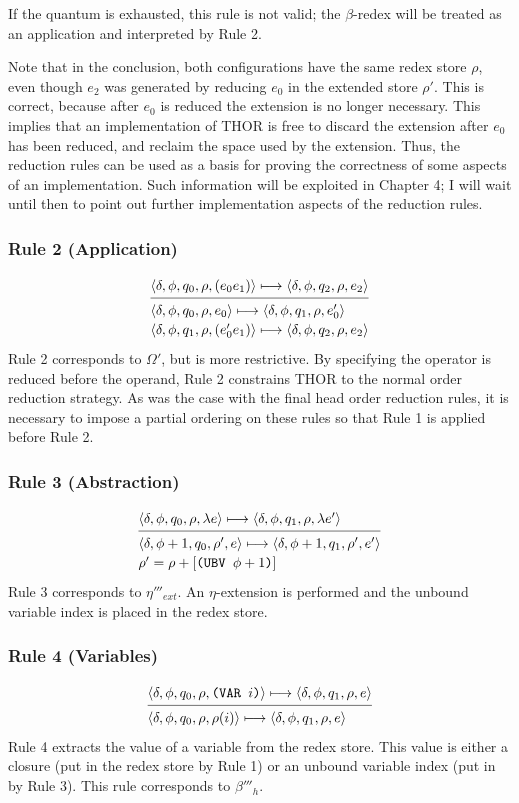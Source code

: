 If the quantum is exhausted, this rule is not valid; the \(\beta\)-redex will be
treated as an application and interpreted by Rule 2.

Note that in the conclusion, both configurations have the same redex store
\(\rho\), even though \(e_2\) was generated by reducing \(e_0\) in the extended
store \(\rho'\). This is correct, because after \(e_0\) is reduced the extension
is no longer necessary. This implies that an implementation of THOR is free to
discard the extension after \(e_0\) has been reduced, and reclaim the space used
by the extension. Thus, the reduction rules can be used as a basis for proving
the correctness of some aspects of an implementation. Such information will be
exploited in Chapter 4; I will wait until then to point out further
implementation aspects of the reduction rules.

\subsubsection*{Rule 2 (Application)}
\[
\semanticrule{
\cfg{\delta}{\phi}{q_0}{\rho}{(e_0e_1)}\redsto
\cfg{\delta}{\phi}{q_2}{\rho}{e_2}
}{
\cfg{\delta}{\phi}{q_0}{\rho}{e_0}\redsto
\cfg{\delta}{\phi}{q_1}{\rho}{e'_0}
\\
\cfg{\delta}{\phi}{q_1}{\rho}{(e'_0e_1)}\redsto
\cfg{\delta}{\phi}{q_2}{\rho}{e_2}
}
\]
Rule 2 corresponds to \(\Omega'\), but is more restrictive. By specifying the
operator is reduced before the operand, Rule 2 constrains THOR to the normal
order reduction strategy. As was the case with the final head order reduction
rules, it is necessary to impose a partial ordering on these rules so that Rule
1 is applied before Rule 2.

\subsubsection*{Rule 3 (Abstraction)}
\[
\semanticrule{
\cfg{\delta}{\phi}{q_0}{\rho}{\lambda e}\redsto
\cfg{\delta}{\phi}{q_1}{\rho}{\lambda e'}
}{
\cfg{\delta}{\phi+1}{q_0}{\rho'}{e}\redsto
\cfg{\delta}{\phi+1}{q_1}{\rho'}{e'}\\
\rho'=\rho+[\THOR{(UBV }\phi+1\THOR{)}]
}
\]
Rule 3 corresponds to \(\eta'''_{ext}\). An \(\eta\)-extension is performed and
the unbound variable index is placed in the redex store.

\subsubsection*{Rule 4 (Variables)}
\[
\semanticrule{
\cfg{\delta}{\phi}{q_0}{\rho}{\THOR{(VAR }i\THOR{)}}\redsto \cfg{\delta}{\phi}{q_1}{\rho}{e}
}{
\cfg{\delta}{\phi}{q_0}{\rho}{\rho(i)}\redsto \cfg{\delta}{\phi}{q_1}{\rho}{e}
}
\]
Rule 4 extracts the value of a variable from the redex store. This value is
either a closure (put in the redex store by Rule 1) or an unbound variable index
(put in by Rule 3). This rule corresponds to \(\beta'''_h\).

